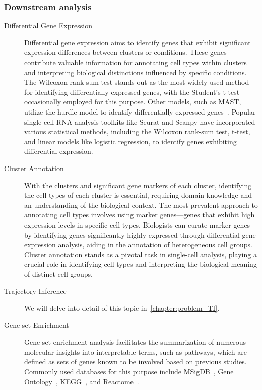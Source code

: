 \subsubsection{Downstream analysis}
\begin{description}
	\item[Differential Gene Expression]
	Differential gene expression aims to identify genes that exhibit significant expression differences between clusters or conditions. These genes contribute valuable information for annotating cell types within clusters and interpreting biological distinctions influenced by specific conditions. The Wilcoxon rank-sum test stands out as the most widely used method for identifying differentially expressed genes, with the Student's t-test occasionally employed for this purpose. Other models, such as MAST, utilize the hurdle model to identify differentially expressed genes~\citep{finak2015mast}. Popular single-cell RNA analysis toolkits like Seurat and Scanpy have incorporated various statistical methods, including the Wilcoxon rank-sum test, t-test, and linear models like logistic regression, to identify genes exhibiting differential expression.

	\item[Cluster Annotation]
	With the clusters and significant gene markers of each cluster, identifying the cell types of each cluster is essential, requiring domain knowledge and an understanding of the biological context. The most prevalent approach to annotating cell types involves using marker genes—genes that exhibit high expression levels in specific cell types. Biologists can curate marker genes by identifying genes significantly highly expressed through differential gene expression analysis, aiding in the annotation of heterogeneous cell groups. Cluster annotation stands as a pivotal task in single-cell analysis, playing a crucial role in identifying cell types and interpreting the biological meaning of distinct cell groups.

	\item[Trajectory Inference]
	We will delve into detail of this topic in~\cref{chapter:problem_TI}.

	\item[Gene set Enrichment]
	Gene set enrichment analysis facilitates the summarization of numerous molecular insights into interpretable terms, such as pathways, which are defined as sets of genes known to be involved based on previous studies. Commonly used databases for this purpose include MSigDB~\citep{liberzon2011msigdb}, Gene Ontology~\citep{gene2004go}, KEGG~\citep{kanehisa2007kegg}, and Reactome~\citep{fabregat2018reactome}.
\end{description}

